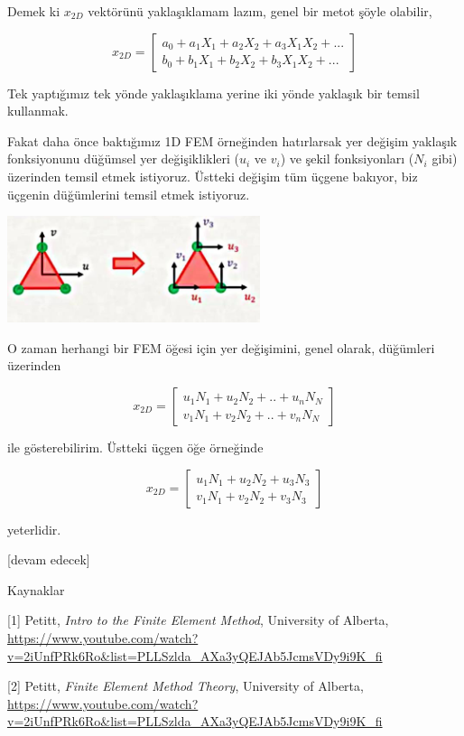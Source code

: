 \documentclass[12pt,fleqn]{article}\usepackage{../../common}
\begin{document}
Demek ki $x_{2D}$ vektörünü yaklaşıklamam lazım, genel bir metot şöyle olabilir,

$$
x_{2D} = \left[\begin{array}{c}
a_0 + a_1 X_1 + a_2 X_2 + a_3 X_1 X_2 + ...\\
b_0 + b_1 X_1 + b_2 X_2 + b_3 X_1 X_2 + ...
\end{array}\right]
$$

Tek yaptığımız tek yönde yaklaşıklama yerine iki yönde yaklaşık bir temsil
kullanmak. 

Fakat daha önce baktığımız 1D FEM örneğinden hatırlarsak yer değişim yaklaşık
fonksiyonunu düğümsel yer değişiklikleri ($u_i$ ve $v_i$) ve şekil fonksiyonları
($N_i$ gibi) üzerinden temsil etmek istiyoruz. Üstteki değişim tüm üçgene
bakıyor, biz üçgenin düğümlerini temsil etmek istiyoruz. 

\includegraphics[width=20em]{compscieng_bpp45fem3_04.jpg}

O zaman herhangi bir FEM öğesi için yer değişimini, genel olarak, düğümleri
üzerinden

$$
x_{2D} = \left[\begin{array}{c}
u_1 N_1 + u_2 N_2 + .. + u_n N_N \\
v_1 N_1 + v_2 N_2 + .. + v_n N_N
\end{array}\right]
$$

ile gösterebilirim. Üstteki üçgen öğe örneğinde 

$$
x_{2D} = \left[\begin{array}{c}
u_1 N_1 + u_2 N_2 + u_3 N_3 \\
v_1 N_1 + v_2 N_2 + v_3 N_3
\end{array}\right]
$$

yeterlidir. 









[devam edecek]

Kaynaklar

[1] Petitt, {\em Intro to the Finite Element Method}, University of Alberta,
    \url{https://www.youtube.com/watch?v=2iUnfPRk6Ro&list=PLLSzlda_AXa3yQEJAb5JcmsVDy9i9K_fi}

[2] Petitt, {\em Finite Element Method Theory}, University of Alberta,
    \url{https://www.youtube.com/watch?v=2iUnfPRk6Ro&list=PLLSzlda_AXa3yQEJAb5JcmsVDy9i9K_fi}
\end{document}
